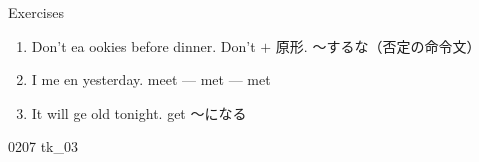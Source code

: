 \documentclass[aspectratio=169,xcolor={dvipsnames,table}]{beamer}
\begin{document}
\begin{frame}[plain]{Exercises }
  \Large
  \begin{enumerate}
    \item<2-> Don't ea  ookies before dinner.%
          \hfill{}{\footnotesize Don't $+$ 原形. ～するな（否定の命令文）}
    \item<4-> I me  en yesterday.%
          \hfill{}{\footnotesize meet  --- met  --- met }
    \item<6-> It will ge  old tonight.%
          \hfill{}{\footnotesize get ～になる}
  \end{enumerate}

  \hfill{\tiny 0207}\,{\scriptsize {}\,tk\_03}

\end{frame}
\end{document}
